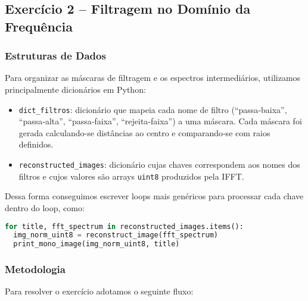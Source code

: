 \documentclass[12pt,a4paper]{article}
\begin{document}
\subsection{Exercício 2 – Filtragem no Domínio da Frequência}

\subsubsection*{Estruturas de Dados}
Para organizar as máscaras de filtragem e os espectros intermediários, utilizamos principalmente dicionários em Python:

\begin{itemize}
  \item \texttt{dict\_filtros}: dicionário que mapeia cada nome de filtro (``passa‐baixa'', ``passa‐alta'', ``passa‐faixa'', ``rejeita‐faixa'') a uma máscara. Cada máscara foi gerada calculando-se distâncias ao centro e comparando‐se com raios definidos.
  \item \texttt{reconstructed\_images}: dicionário cujas chaves correspondem aos nomes dos filtros e cujos valores são arrays \texttt{uint8} produzidos pela IFFT.
\end{itemize}

Dessa forma conseguimos escrever loops mais genéricos para processar cada chave dentro do loop, como:
\begin{lstlisting}[language=Python]
for title, fft_spectrum in reconstructed_images.items():
  img_norm_uint8 = reconstruct_image(fft_spectrum)
  print_mono_image(img_norm_uint8, title)
\end{lstlisting}

\subsubsection*{Metodologia}

Para resolver o exercício adotamos o seguinte fluxo:
\end{document}
